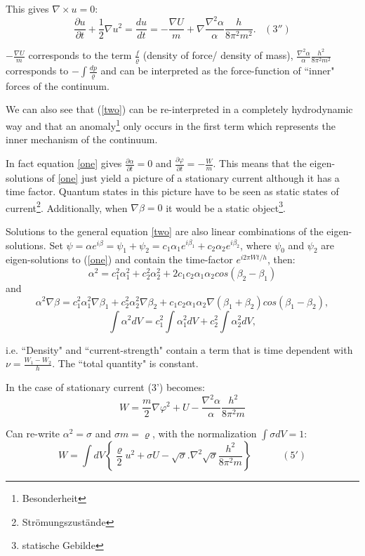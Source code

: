 This gives $\nabla\times u = 0$:
\[
\frac{\partial u}{\partial t} +\frac{1}{2}\nabla u^2=\frac{du}{dt} =-\frac{\nabla U}{m}+\nabla\frac{\nabla^2\alpha}{\alpha}\frac{h}{8\pi^2 m^2}.
\;\;\;(3'')
\]

\noindent $-\frac{\nabla U}{m}$ corresponds to the term $\frac{f}{\varrho}$ (density of force/ density of mass), $\frac{\nabla^2\alpha}{\alpha}\frac{h^2}{8\pi^2 m^2}$ corresponds to $-\int\frac{dp}{\varrho}$ and can be interpreted as the force-function of ``inner" forces of the continuum.

We can also see that (\ref{two}) can be re-interpreted in a completely hydrodynamic way and that an anomaly\footnote{Besonderheit} only occurs in the first term which represents the inner mechanism of the continuum.

In fact equation \ref{one} gives $\frac{\partial \alpha}{\partial t}=0$ and $\frac{\partial \varphi}{\partial t}=-\frac{W}{m}$. This means that the eigen-solutions of \ref{one} just yield a picture of a stationary current although it has a time factor. Quantum states in this picture have to be seen as static states of current\footnote{Str\"omungszust\"ande}. Additionally, when  $\nabla\beta=0$ it would be a static object\footnote{statische Gebilde}.


Solutions to the general equation \ref{two} are also linear combinations of the eigen-solutions. Set $\psi = \alpha e^{i\beta} = \psi_1 + \psi_2 = c_1\alpha_1 e^{i\beta_1} + c_2\alpha_2 e^{i\beta_2}$, where $\psi_0$ and $\psi_2$ are eigen-solutions to (\ref{one}) and contain the time-factor $e^{i2\pi Wt/h}$, then:
\[
\alpha^2 = c_1^2\alpha_1^2 + c_2^2\alpha_2^2 + 2c_1 c_2\alpha_1\alpha_2 cos(\beta_2 - \beta_1)
\]
\noindent and
\[
\alpha^2 \nabla\beta = c_1^2\alpha_1^2\nabla\beta_1 + c_2^2\alpha_2^2\nabla\beta_2+c_1c_2\alpha_1\alpha_2\nabla (\beta_1 + \beta_2) cos(\beta_1 - \beta_2),
\]
\[
\int\alpha^2 dV= c_1^2\int\alpha_1^2 dV + c_2^2\int\alpha_2^2 dV,
\]

\noindent i.e. ``Density" and ``current-strength" contain a term that is time dependent with $\nu = \frac{W_1 - W_2}{h}$. The ``total quantity" is constant.

In the case of stationary current (3') becomes:
\begin{equation}
\label{five}
W = \frac{m}{2}\nabla\varphi^2 + U-\frac{\nabla^2\alpha}{\alpha}\frac{h^2}{8\pi^2 m}
\end{equation}

\noindent Can re-write $\alpha^2=\sigma$ and $\sigma m = \varrho$, with the normalization $\int\sigma dV =1$:
\[
W = \int dV \left\{\frac{\varrho}{2}u^2 + \sigma U -\sqrt{\sigma}.\nabla^2\sqrt{\sigma}\frac{h^2}{8\pi^2 m} \right\} \;\;\;\;\;\;\;\;\;\;\; (5')
\]

